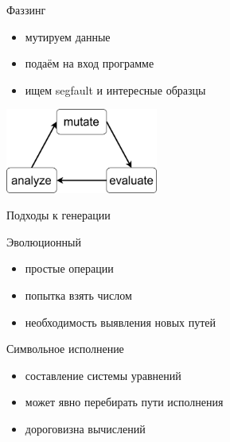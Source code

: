 \documentclass[hyperref={unicode=true}, 12pt]{beamer}
\begin{document}

	\begin{frame}{Фаззинг}
		\begin{minipage}{0.6\textwidth}
			
			\begin{itemize}
				\item мутируем данные
				
				\item подаём на вход программе
				
				\item ищем segfault и интересные образцы
			\end{itemize}
			
		\end{minipage}\begin{minipage}{0.43\textwidth}
		
		\includegraphics[width=5cm]{fuzz_loop.png}
	\end{minipage}
	\end{frame}

	\begin{frame}[t]{Подходы к генерации}
		
		\vspace{1.2cm}
		\begin{minipage}[t]{0.5\textwidth}
			\raggedright
			Эволюционный
			
			\begin{itemize}
				\item простые операции
				\item попытка взять числом
				\item необходимость выявления новых путей
			\end{itemize}
			
		\end{minipage}\begin{minipage}[t]{0.5\textwidth}
			\raggedright
			Символьное исполнение
			
			\begin{itemize}
				\item составление системы уравнений
				\item может явно перебирать пути исполнения
				\item дороговизна вычислений
			\end{itemize}
		
	\end{minipage}
			
	\end{frame}
\end{document}
